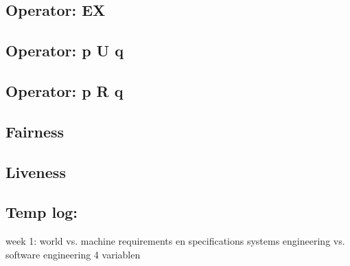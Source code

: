 \documentclass{article}
\begin{document}
\subsection{Operator: EX}

\subsection{Operator: p U q}

\subsection{Operator: p R q}

\subsection{Fairness}

\subsection{Liveness}

\newpage
\subsection{Temp log:}
week 1: 
world vs. machine
requirements en specifications
systems engineering vs. software engineering
4 variablen
\newpage


\end{document}
